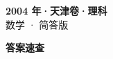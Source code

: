 \documentclass[zihao=-4, a4paper]{ctexart}
\begin{document}
\begin{center}
  {\Large\bfseries 2004 年·天津卷·理科}\\[4pt]
  {\large 数学 · 简答版}
\end{center}
\medskip
{}

\clearpage
{}
\begin{center}{\Large\bfseries 答案速查}\end{center}
\medskip

\end{document}
